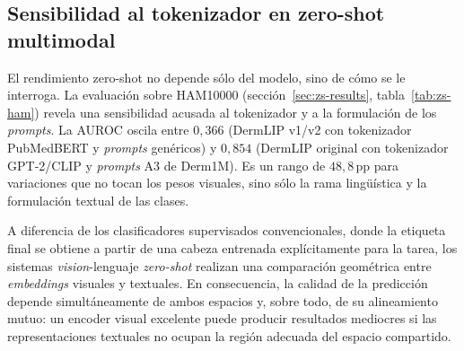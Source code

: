 \subsection{Sensibilidad al tokenizador en zero-shot multimodal}
\label{sec:disc-zs}

El rendimiento zero-shot no depende sólo del modelo, sino de cómo se
le interroga. La evaluación sobre HAM10000
(sección~\ref{sec:zs-results}, tabla~\ref{tab:zs-ham}) revela una
sensibilidad acusada al tokenizador y a la formulación de los
\emph{prompts}. La AUROC oscila entre $0{,}366$ (DermLIP v1/v2 con
tokenizador PubMedBERT y \emph{prompts} genéricos) y $0{,}854$
(DermLIP original con tokenizador GPT-2/CLIP y \emph{prompts} A3 de
Derm1M). Es un rango de $48{,}8$\,pp para variaciones que no tocan
los pesos visuales, sino sólo la rama lingüística y la formulación
textual de las clases.

A diferencia de los clasificadores supervisados convencionales, donde
la etiqueta final se obtiene a partir de una cabeza entrenada
explícitamente para la tarea, los sistemas \emph{vision}-lenguaje
\emph{zero-shot} realizan una comparación geométrica entre
\emph{embeddings} visuales y textuales. En consecuencia, la calidad de
la predicción depende simultáneamente de ambos espacios y, sobre todo,
de su alineamiento mutuo: un encoder visual excelente puede producir
resultados mediocres si las representaciones textuales no ocupan la
región adecuada del espacio compartido.

